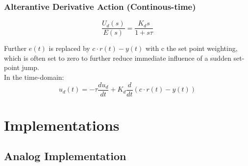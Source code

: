\begin{frame}
	\frametitle{Alterantive Derivative Action (Continous-time)}
	\begin{equation*}
		\frac{U_d(s)}{E(s)} = \frac{K_d s}{1+s\tau}
	\end{equation*}
	
	Further $e(t)$ is replaced by $c\cdot r(t)-y(t)$ with c the set point weighting, which is often set to zero to further reduce immediate influence of a sudden set-point jump. \\
	\vspace{1em}
	In the time-domain:
	\begin{equation*}
		u_d(t) = -\tau\frac{du_d}{dt} + K_d \frac{d}{dt}(c\cdot r(t)-y(t))
	\end{equation*}
\end{frame}

\section{Implementations}

\subsection{Analog Implementation}

